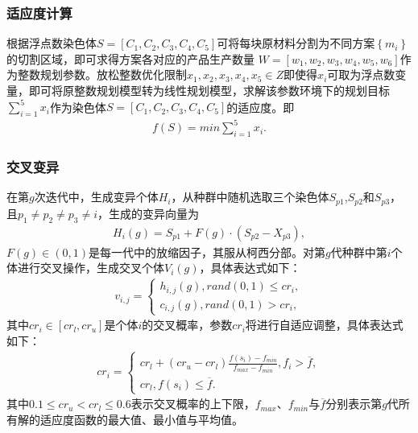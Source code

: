 \documentclass{whutmod}
\begin{document}
      \subsubsection{适应度计算}
      根据浮点数染色体$S=[C_1,C_2,C_3,C_4,C_5]$可将每块原材料分割为不同方案$\left \{ m_i \right \}$的切割区域，即可求得方案各对应的产品生产数量 $W=[w_{1},w_{2},w_{3},w_{4},w_{5},w_{6}]$作为整数规划参数。放松整数优化限制$x_1,x_2,x_3,x_4,x_5\in Z$即使得$x_i$可取为浮点数变量，即可将原整数规划模型转为线性规划模型，求解该参数环境下的规划目标$\sum_{i=1}^5x_i$作为染色体$S=[C_1,C_2,C_3,C_4,C_5]$的适应度。即
       \begin{gather*}
      f(S)=min\sum_{i=1}^5x_i.
      \end{gather*}
      \subsubsection{交叉变异}
    在第$g$次迭代中，生成变异个体$H_i$，从种群中随机选取三个染色体$S_{p1}$,$S_{p2}$和$S_{p3}$，且$p_1\neq p_2\neq p_3\neq i$，生成的变异向量为
    \begin{gather*}
    H_i(g)=S_{p1}+F(g)\cdot (S_{p2}-X_{p3}),
    \end{gather*}
    $F(g)\in (0,1)$是每一代中的放缩因子，其服从柯西分部。对第$g$代种群中第$i$个体进行交叉操作，生成交叉个体$V_i(g)$，具体表达式如下：
    \begin{gather*}
    v_{i,j}=\left\{\begin{matrix}h_{i,j}(g),rand(0,1)\leq cr_{i},
    \\ c_{i,j}(g),rand(0,1)>cr_{i},
    \end{matrix}\right.
    \end{gather*}
    其中$cr_{i}\in[cr_{l},cr_{u}]$是个体$i$的交叉概率，参数$cr_{i}$将进行自适应调整，具体表达式如下：
    \begin{gather*}
    cr_{i}=\left\{\begin{matrix}cr_{l}+(cr_{u}-cr_{l})\frac{f(s_{i})-f_{min}}{f_{max}-f_{min}} , f_{i}>\overline{f},
    \\ cr_{l},f(s_{i})\leqslant  \overline{f}.
    \end{matrix}\right.
    \end{gather*}
    其中$0.1\leqslant cr_{u}<cr_{l}\leqslant 0.6$表示交叉概率的上下限，$f_{max}$、$f_{min}$与$\overline{f}$分别表示第$g$代所有解的适应度函数的最大值、最小值与平均值。
\end{document}
